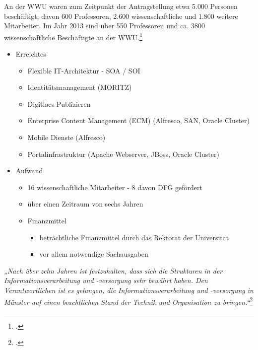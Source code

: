 An der WWU waren zum Zeitpunkt der Antragstellung etwa 5.000 Personen beschäftigt, davon 600 Professoren, 2.600 wissenschaftliche und 1.800 weitere Mitarbeiter. Im Jahr 2013 sind über 550 Professoren und ca. 3800 wissenschaftliche Beschäftigte an der WWU.\footcite{vogl_bericht_2013}


\begin{itemize}
	\item Erreichtes
	\begin{itemize}
		\item Flexible IT-Architektur - SOA / SOI
		\item Identitätsmanagement (MORITZ)
		\item Digitlaes Publizieren
		\item Enterprise Content Management (ECM) (Alfresco, SAN, Oracle Cluster)
		\item Mobile Dienste (Alfresco)
		\item Portalinfrastruktur (Apache Webserver, JBoss, Oracle Cluster)
	\end{itemize}
\end{itemize}

		
\begin{itemize}	
	\item Aufwand
	\begin{itemize}
		\item 16 wissenschaftliche Mitarbeiter - 8 davon DFG gefördert
		\item über einen Zeitraum von sechs Jahren
		\item Finanzmittel
		\begin{itemize}
			\item beträchtliche Finanzmittel durch das Rektorat der Universität
			\item vor allem notwendige Sachausgaben
		\end{itemize}
	\end{itemize}
\end{itemize}

\textit{„Nach über zehn Jahren ist festzuhalten, dass sich die Strukturen in der Informationsverarbeitung und -versorgung sehr bewährt haben. Den Verantwortlichen ist es gelungen, die Informationsverarbeitung und -versorgung in Münster auf einen beachtlichen Stand der Technik und Organisation zu bringen.“}\footcite{bode_informationsmanagement_2010}


